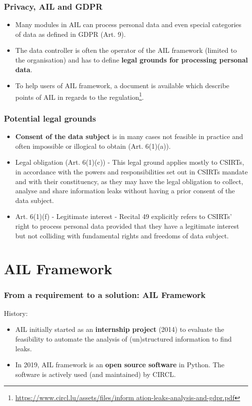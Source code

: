 \begin{frame}
        \frametitle{Privacy, AIL and GDPR}
        \begin{itemize}
                \item Many modules in AIL can process personal data and even special categories of data as defined in GDPR (Art. 9).
                \item The data controller is often the operator of the AIL framework (limited to the organisation) and has to define {\bf legal grounds for processing personal data}.
                \item To help users of AIL framework, a document is available which describe points of AIL in regards to the regulation\footnote{\url{https://www.circl.lu/assets/files/inform
ation-leaks-analysis-and-gdpr.pdf}}.
        \end{itemize}
\end{frame}

\begin{frame}
        \frametitle{Potential legal grounds}
        \begin{itemize}
                \item {\bf Consent of the data subject} is in many cases not feasible in practice and often impossible or illogical to obtain (Art. 6(1)(a)).
                \item Legal obligation (Art. 6(1)(c)) - This legal ground applies mostly to CSIRTs, in accordance with the powers and responsibilities set out in CSIRTs mandate and with their constituency, as they may have the legal obligation to collect, analyse and share information leaks without having a prior consent of the data subject.
				\item Art. 6(1)(f) - Legitimate interest - Recital 49 explicitly refers to CSIRTs’ right to process personal data provided that they have a legitimate interest but not colliding with fundamental rights and freedoms of data subject.
        \end{itemize}
\end{frame}


\section{AIL Framework}
\begin{frame}
    \frametitle{From a requirement to a solution: AIL Framework}
    \large{History:}
    \begin{itemize}
        \item AIL initially started as an \textbf{internship project} (2014) to evaluate the feasibility to automate the analysis of (un)structured information to find leaks.
        \item In 2019, AIL framework is an \textbf{open source software} in Python. The software is actively used (and maintained) by CIRCL.
    \end{itemize}
\end{frame}

